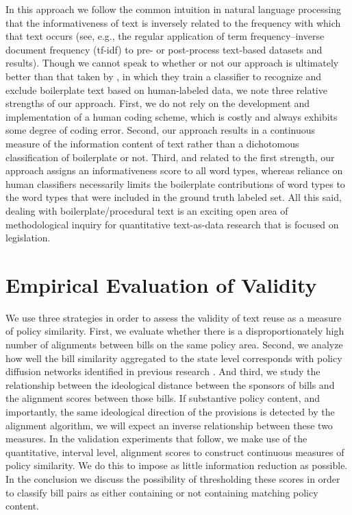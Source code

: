 \documentclass[12pt]{article} %
\begin{document}
In this approach we follow the common intuition in natural language processing that the informativeness of text is inversely related to the frequency with which that text occurs \citep{robertson2004understanding} (see, e.g., the regular application of term frequency--inverse document frequency (tf-idf) to pre- or post-process text-based datasets and results). Though we cannot speak to whether or not our approach is ultimately better than that taken by \citet{wilkerson2015tracing}, in which they train a classifier to recognize and exclude boilerplate text based on human-labeled data, we note three relative strengths of our approach. First, we do not rely on the development and implementation of a human coding scheme, which is costly and always exhibits some degree of coding error. Second, our approach results in a continuous measure of the information content of text rather than a dichotomous classification of boilerplate or not. Third, and related to the first strength, our approach assigns an informativeness score to all word types, whereas reliance on human classifiers necessarily limits the boilerplate contributions of word types to the word types that were included in the ground truth labeled set.  All this said, dealing with boilerplate/procedural text is an exciting open area of methodological inquiry for quantitative text-as-data research that is focused on legislation.

\section{Empirical Evaluation of Validity}

We use three strategies in order to assess the validity of text reuse as a measure of policy similarity. First, we evaluate whether there is a disproportionately high number of alignments between bills on the same policy area. Second, we analyze how well the bill similarity aggregated to the state level corresponds with policy diffusion networks identified in previous research \citep{desmarais2015}. And third, we study the relationship between the ideological distance between the sponsors of bills and the alignment scores between those bills. If substantive policy content, and importantly, the same ideological direction of the provisions is detected by the alignment algorithm, we will expect an inverse relationship between these two measures. In the validation experiments that follow, we make use of the quantitative, interval level, alignment scores to construct continuous measures of policy similarity. We do this to impose as little information reduction as possible. In the conclusion we discuss the possibility of thresholding these scores in order to classify bill pairs as either containing or not containing matching policy content.
\end{document}
